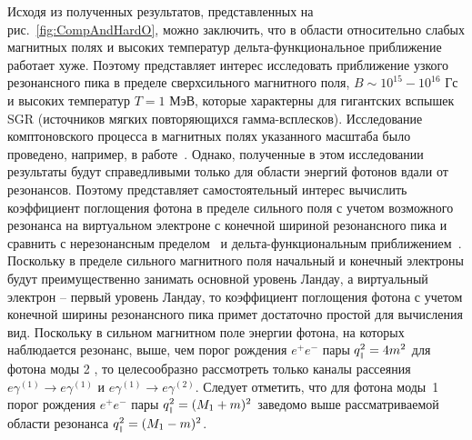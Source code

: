 
Исходя из полученных результатов, представленных на рис.~\ref{fig:CompAndHardO}, можно заключить, что в области относительно слабых магнитных полях и высоких температур дельта-функциональное приближение работает хуже. Поэтому представляет интерес исследовать приближение узкого резонансного пика в пределе сверхсильного магнитного поля, \mbox{$B\sim 
10^{15}-10^{16}$} Гс и высоких температур $T=1$ МэВ, которые характерны для 
гигантских вспышек SGR (источников мягких повторяющихся гамма-всплесков).  
Исследование комптоновского процесса в магнитных полях указанного масштаба было 
проведено, например, в работе~\cite{Chistyakov:2009}. Однако, полученные в этом 
исследовании результаты будут справедливыми только для области энергий фотонов 
вдали от резонансов. Поэтому представляет самостоятельный интерес вычислить 
коэффициент поглощения фотона в пределе сильного поля с учетом возможного 
резонанса на виртуальном электроне с конечной шириной резонансного пика и 
сравнить с нерезонансным пределом~\cite{Chistyakov:2009} и 
дельта-функциональным приближением~\cite{Rumyantsev:2017,Rumyantsev:2026}. Поскольку в пределе 
сильного магнитного поля начальный и конечный электроны будут преимущественно 
занимать основной уровень Ландау, а виртуальный электрон -- первый уровень 
Ландау, то коэффициент поглощения фотона с учетом конечной ширины резонансного 
пика примет достаточно простой для вычисления вид. Поскольку в сильном 
магнитном поле энергии фотона, на которых наблюдается резонанс, 
выше, чем порог рождения $e^+e^-$ пары $q_{\mbox{\tiny $\|$}}^2=4m^2$ для фотона моды 2 , 
то целесообразно рассмотреть только каналы рассеяния $e\gamma^{(1)}\to 
e\gamma^{(1)}$ и $e\gamma^{(1)}\to e\gamma^{(2)}$. Следует отметить, что для 
фотона моды~1 порог рождения $e^+e^-$ пары $q_{\mbox{\tiny $\|$}}^2=(M_1+m)^2$ заведомо 
выше рассматриваемой области резонанса $q_{\mbox{\tiny $\|$}}^2=(M_1-m)^2$.


